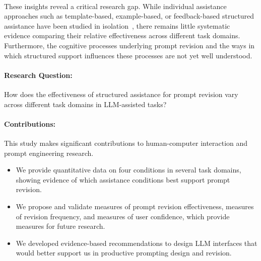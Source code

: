\paragraph{}
These insights reveal a critical research gap. While individual assistance approaches such as template-based, example-based, or feedback-based structured assistance have been studied in isolation~\cite{Khurana2024Why,Mao2025Prompts}, there remains little systematic evidence comparing their relative effectiveness across different task domains. Furthermore, the cognitive processes underlying prompt revision and the ways in which structured support influences these processes are not yet well understood.
\paragraph{Research Question:}
How does the effectiveness of structured assistance for prompt revision vary across different task domains in LLM-assisted tasks?
\paragraph{Contributions:}
This study makes significant contributions to human-computer interaction and prompt engineering research.
\begin{itemize}
    \item We provide quantitative data on four conditions in several task domains, showing evidence of which assistance conditions best support prompt revision.
    \item We propose and validate measures of prompt revision effectiveness, measures of revision frequency, and measures of user confidence, which provide measures for future research.
    \item We developed evidence-based recommendations to design LLM interfaces that would better support us in productive prompting design and revision.
\end{itemize}
